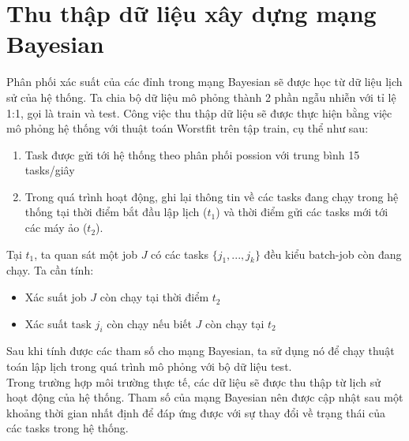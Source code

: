 \documentclass{my_style}
\begin{document}
\section{Thu thập dữ liệu xây dựng mạng Bayesian}
Phân phối xác suất của các đỉnh trong mạng Bayesian sẽ được học từ dữ liệu lịch sử của hệ thống. Ta chia bộ dữ liệu mô phỏng thành 2 phần ngẫu nhiễn với tỉ lệ 1:1, gọi là train và test. Công việc thu thập dữ liệu sẽ được thực hiện bằng việc mô phỏng hệ thống với thuật toán Worstfit trên tập train, cụ thể như sau: 
\begin{enumerate}
	\item Task được gửi tới hệ thống theo phân phối possion với trung bình 15 tasks/giây
	\item Trong quá trình hoạt động, ghi lại thông tin về các tasks đang chạy trong hệ thống tại thời điểm bắt đầu lập lịch ($t_{1}$) và thời điểm gửi các tasks mới tới các máy ảo ($t_{2}$). 
\end{enumerate}
Tại $t_{1}$, ta quan sát một job $J$ có các tasks $\{j_{1}, ..., j_{k}\}$ đều kiểu batch-job còn đang chạy. Ta cần tính: 
\begin{itemize}
	\item Xác suất job $J$ còn chạy tại thời điểm $t_{2}$
	\item Xác suất task $j_{i}$ còn chạy nếu biết $J$ còn chạy tại $t_{2}$
\end{itemize}
Sau khi tính được các tham số cho mạng Bayesian, ta sử dụng nó để chạy thuật toán lập lịch trong quá trình mô phỏng với bộ dữ liệu test. \\
Trong trường hợp môi trường thực tế, các dữ liệu sẽ được thu thập từ lịch sử hoạt động của hệ thống. Tham số của mạng Bayesian nên được cập nhật sau một khoảng thời gian nhất định để đáp ứng được với sự thay đổi về trạng thái của các tasks trong hệ thống. 
\end{document}
